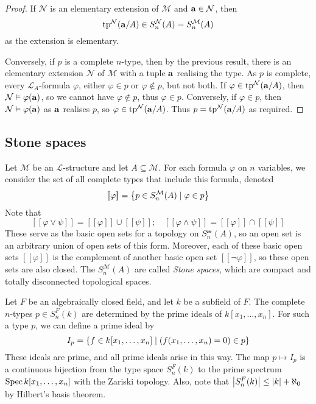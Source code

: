 \begin{proof}
    If \( \mathcal N \) is an elementary extension of \( \mathcal M \) and \( \vb a \in \mathcal N \), then
    \[ \operatorname{tp}^{\mathcal N}(\vb a/A) \in S_n^{\mathcal N}(A) = S_n^{\mathcal M}(A) \]
    as the extension is elementary.

    Conversely, if \( p \) is a complete \( n \)-type, then by the previous result, there is an elementary extension \( \mathcal N \) of \( \mathcal M \) with a tuple \( \vb a \) realising the type.
    As \( p \) is complete, every \( \mathcal L_A \)-formula \( \varphi \), either \( \varphi \in p \) or \( \varphi \notin p \), but not both.
    If \( \varphi \in \operatorname{tp}^{\mathcal N}(\vb a/A) \), then \( \mathcal N \vDash \varphi(\vb a) \), so we cannot have \( \varphi \notin p \), thus \( \varphi \in p \).
    Conversely, if \( \varphi \in p \), then \( \mathcal N \vDash \varphi(\vb a) \) as \( \vb a \) realises \( p \), so \( \varphi \in \operatorname{tp}^{\mathcal N}(\vb a/A) \).
    Thus \( p = \operatorname{tp}^{\mathcal N}(\vb a/A) \) as required.
\end{proof}

\subsection{Stone spaces}
Let \( \mathcal M \) be an \( \mathcal L \)-structure and let \( A \subseteq \mathcal M \).
For each formula \( \varphi \) on \( n \) variables, we consider the set of all complete types that include this formula, denoted
\[ [\![\varphi]\!] = \qty{p \in S_n^{\mathcal M}(A) \mid \varphi \in p} \]
Note that
\[ [\![\varphi \vee \psi]\!] = [\![\varphi]\!] \cup [\![\psi]\!];\quad [\![\varphi \wedge \psi]\!] = [\![\varphi]\!] \cap [\![\psi]\!] \]
These serve as the basic open sets for a topology on \( S_n^{\mathcal m}(A) \), so an open set is an arbitrary union of open sets of this form.
Moreover, each of these basic open sets \( [\![\varphi]\!] \) is the complement of another basic open set \( [\![\neg\varphi]\!] \), so these open sets are also closed.
The \( S_n^{\mathcal M}(A) \) are called \emph{Stone spaces}, which are compact and totally disconnected topological spaces.
\begin{example}
    Let \( F \) be an algebraically closed field, and let \( k \) be a subfield of \( F \).
    The complete \( n \)-types \( p \in S_n^F(k) \) are determined by the prime ideals of \( k[x_1, \dots, x_n] \).
    For such a type \( p \), we can define a prime ideal by
    \[ I_p = \qty{f \in k[x_1, \dots, x_n] \mid (f(x_1, \dots, x_n) = 0) \in p} \]
    These ideals are prime, and all prime ideals arise in this way.
    The map \( p \mapsto I_p \) is a continuous bijection from the type space \( S_n^F(k) \) to the prime spectrum \( \operatorname{Spec} k[x_1, \dots, x_n] \) with the Zariski topology.
    Also, note that \( \abs{S_n^F(k)} \leq \abs{k} + \aleph_0 \) by Hilbert's basis theorem.
\end{example}


